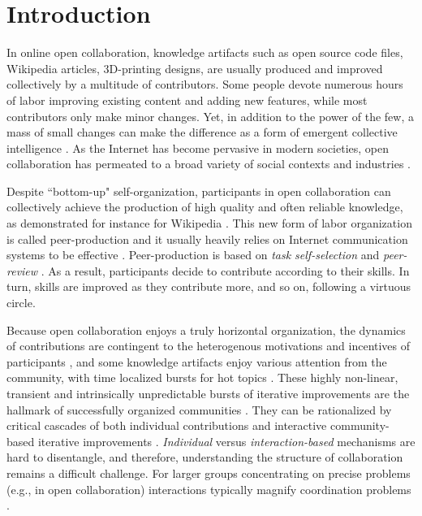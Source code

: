 \section{Introduction}
In online open collaboration, knowledge artifacts such as open source code files, Wikipedia articles,  3D-printing designs, are usually produced and improved collectively by a multitude of contributors. Some people devote numerous hours of labor improving existing content and adding new features, while most contributors only make minor changes. Yet, in addition to the power of the few, a mass of small changes can make the difference as a form of emergent collective intelligence \cite{kittur2007power}.  As the Internet has become pervasive in modern societies, open collaboration has permeated to a broad variety of social contexts and industries \cite{benkler2011leviathan}. 

Despite ``bottom-up" self-organization, participants in open collaboration can collectively achieve  the production of high quality and often reliable knowledge, as demonstrated for instance for Wikipedia \cite{giles2005internet}. This new form of labor organization is called peer-production and it usually heavily relies on Internet communication systems to be effective \cite{benkler2002}. Peer-production is based on {\it task self-selection} and {\it peer-review} \cite{benkler2002}. As a result, participants decide to contribute according to their skills. In turn, skills are improved as they contribute more, and so on, following a virtuous circle.

Because open collaboration enjoys a truly horizontal organization, the dynamics of contributions are contingent to the heterogenous motivations and incentives of participants \cite{vonKrogh2012}, and some knowledge artifacts enjoy various attention from the community, with time localized bursts for hot topics \cite{keegan2013hotoff}. These  highly non-linear, transient and intrinsically unpredictable bursts of iterative improvements are the hallmark of successfully organized communities \cite{vonkrogh2014designing}. They can be rationalized by critical cascades of both individual contributions and interactive community-based iterative improvements \cite{sornette2014howmuch}. {\it Individual} versus {\it interaction-based} mechanisms are hard to disentangle, and therefore, understanding the structure of collaboration remains a difficult challenge. For larger groups concentrating on precise problems (e.g., in open collaboration) interactions typically magnify coordination problems \cite{halfaker2013}. %

